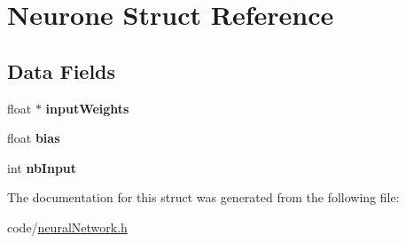 \hypertarget{structNeurone}{}\section{Neurone Struct Reference}
\label{structNeurone}
\subsection*{Data Fields}
\begin{DoxyCompactItemize}
\item 
float $\ast$ {\bfseries input\+Weights}\hypertarget{structNeurone_a9c6f8016314f66cc187cf13f2d242906}{}\label{structNeurone_a9c6f8016314f66cc187cf13f2d242906}

\item 
float {\bfseries bias}\hypertarget{structNeurone_a552dce059c7a7227afd3ef9e3a924176}{}\label{structNeurone_a552dce059c7a7227afd3ef9e3a924176}

\item 
int {\bfseries nb\+Input}\hypertarget{structNeurone_a76c24580e3e24b1a99ee806d994668eb}{}\label{structNeurone_a76c24580e3e24b1a99ee806d994668eb}

\end{DoxyCompactItemize}


The documentation for this struct was generated from the following file\+:\begin{DoxyCompactItemize}
\item 
code/\hyperlink{neuralNetwork_8h}{neural\+Network.\+h}\end{DoxyCompactItemize}
